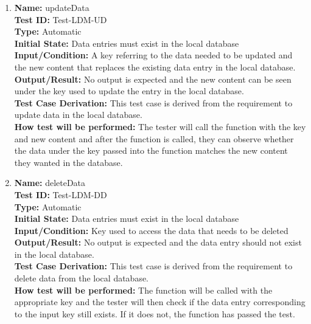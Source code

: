 \documentclass[12pt, titlepage]{article}
\begin{document}
\begin{enumerate}
  \item \textbf{Name:} updateData \label{itm:Test-LDM-UD} \\
        \textbf{Test ID:} Test-LDM-UD \\
        \textbf{Type:} Automatic \\
        \textbf{Initial State:} Data entries must exist in the local database \\
        \textbf{Input/Condition:} A key referring to the data needed to be updated and the new content that replaces the existing data entry in the local database. \\
        \textbf{Output/Result:} No output is expected and the new content can be seen under the key used to update the entry in the local database. \\
        \textbf{Test Case Derivation:} This test case is derived from the requirement to update data in the local database. \\
        \textbf{How test will be performed:} The tester will call the function with the key and new content and after the function is called, they can observe whether the data under the key passed into the function matches the new content they wanted in the database. \\

  \item \textbf{Name:} deleteData \label{itm:Test-LDM-DD} \\
        \textbf{Test ID:} Test-LDM-DD \\
        \textbf{Type:} Automatic \\
        \textbf{Initial State:} Data entries must exist in the local database \\
        \textbf{Input/Condition:} Key used to access the data that needs to be deleted \\
        \textbf{Output/Result:} No output is expected and the data entry should not exist in the local database. \\
        \textbf{Test Case Derivation:} This test case is derived from the requirement to delete data from the local database. \\
        \textbf{How test will be performed:} The function will be called with the appropriate key and the tester will then check if the data entry corresponding to the input key still exists. If it does not, the function has passed the test. \\


\end{enumerate}
\end{document}
